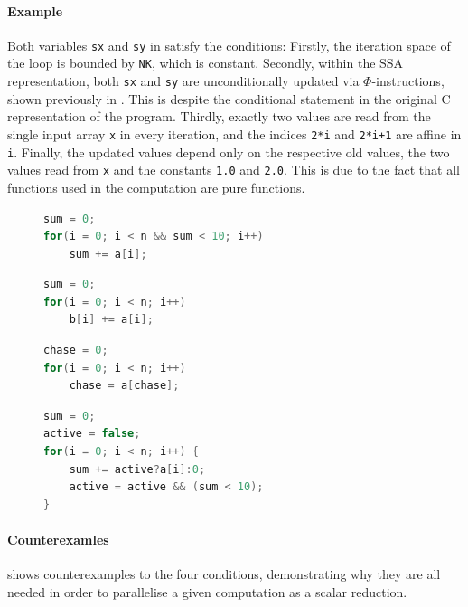     \paragraph*{Example}
    Both variables \texttt{sx} and \texttt{sy} in
     satisfy the conditions:
    Firstly, the iteration space of the loop is bounded by \texttt{NK}, which is
    constant.
    Secondly, within the SSA representation, both \texttt{sx} and \texttt{sy}
    are unconditionally updated via $\Phi$-instructions, shown previously in
    .
    This is despite the conditional statement in the original C representation
    of the program.
    Thirdly, exactly two values are read from the single input array \texttt{x}
    in every iteration, and the indices \texttt{2*i} and \texttt{2*i+1} are
    affine in \texttt{i}.
    Finally, the updated values depend only on the respective old values,
    the two values read from \texttt{x} and the constants \texttt{1.0} and
    \texttt{2.0}.
    This is due to the fact that all functions used in the computation are pure
    functions.

\begin{figure}[t]
\begin{lstlisting}[language=C++]
sum = 0;
for(i = 0; i < n && sum < 10; i++)
    sum += a[i];
\end{lstlisting}
\begin{lstlisting}[language=C++]
sum = 0;
for(i = 0; i < n; i++)
    b[i] += a[i];
\end{lstlisting}
\begin{lstlisting}[language=C++]
chase = 0;
for(i = 0; i < n; i++)
    chase = a[chase];
\end{lstlisting}
\begin{lstlisting}[language=C++,label={counterexamples},caption=
   {Counterexamples to the four conditions: None of these computations can be
    parallelised as scalar reductions.
    The first and last example implement the same program.\parfillskip=0pt}]
sum = 0;
active = false;
for(i = 0; i < n; i++) {
    sum += active?a[i]:0;
    active = active && (sum < 10);
}
\end{lstlisting}
\end{figure}

    \paragraph*{Counterexamles}
     shows counterexamples to the four conditions,
    demonstrating why they are all needed in order to parallelise a given
    computation as a scalar reduction.

